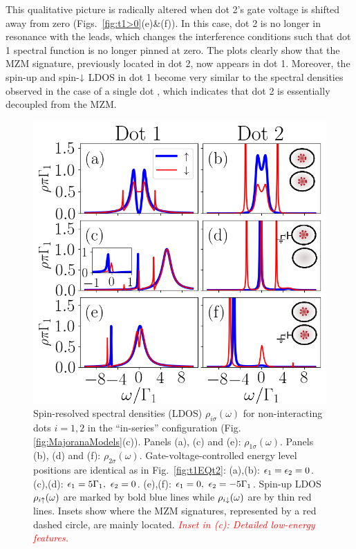 \documentclass[showpacs,aps,prb,reprint,superscriptaddress]{revtex4-2}
\newcommand{\change}[1]{\textcolor{red}{\sl#1}}
\begin{document}
This qualitative picture is radically altered when dot 2's gate voltage is shifted away from zero (Figs.\ \ref{fig:t1>0}(e)\&(f)). In this case, dot 2 is no longer in resonance with the leads, which changes the interference conditions such that dot 1 spectral function is no longer pinned at zero. The plots clearly show that the MZM signature, previously located in dot 2, now appears in dot 1. Moreover, the spin-up and spin-$\downarrow$ LDOS in dot 1 become very similar to the spectral densities observed in the case of a single dot \cite{liu_detecting_2011,vernek_subtle_2014}, which indicates that dot 2 is essentially decoupled from the MZM. 




\begin{figure}[t]
\begin{center}
\includegraphics[scale=0.48]{Graficos/t2gt0.png}
\caption{  \label{fig:t2>0} Spin-resolved spectral densities (LDOS) $\rho_{i \sigma}(\omega)$ for non-interacting  dots $i=1,2$ in the ``in-series'' configuration (Fig.\ref{fig:MajoranaModels}(c)). 
Panels (a), (c) and (e): $\rho_{1 \sigma}(\omega)$. Panels (b), (d) and  (f): $\rho_{2 \sigma}(\omega)$. Gate-voltage-controlled energy level  positions are identical as in Fig.\ \ref{fig:t1EQt2}: (a),(b): $\epsilon_1=\epsilon_2=0$. (c),(d): $\epsilon_1=5\Gamma_1, \ \epsilon_2 =0$.  (e),(f): $\epsilon_1=0, \ \epsilon_2 =-5\Gamma_1$.  
Spin-up LDOS $\rho_{i \uparrow}(\omega)$ are marked by bold blue lines while $\rho_{i \downarrow}(\omega)$ are by thin red lines. Insets show where the MZM signatures, represented by a red dashed circle, are mainly located. \change{Inset in (c): Detailed low-energy features.}
%
}
%
\end{center}
\end{figure}
     
\end{document}
